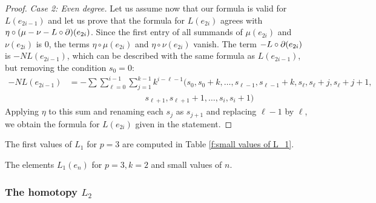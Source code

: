\begin{proof}
    \medskip\noindent\emph{Case 2: Even degree.}
    Let us assume now that our formula is valid for $L(e_{2i-1})$ and let us prove that the formula for $L(e_{2i})$ agrees with $\eta\circ (\mu - \nu - L\circ \operatorname{\partial})(e_{2i})$. Since the first entry of all summands of $\mu(e_{2i})$ and $\nu(e_{2i})$ is $0$, the terms $\eta\circ \mu(e_{2i})$ and $\eta\circ \nu(e_{2i})$ vanish. The term $-L\circ \operatorname{\partial}(e_{2i})$ is $-N L(e_{2i-1})$, which can be described with the same formula as $L(e_{2i-1})$, but removing the condition $s_0 = 0$:
    \begin{align*}
        -N L(e_{2i-1}) &= -\sum\sum_{\ell = 0}^{i-1}\sum_{j=1}^{k-1} k^{i-\ell-1} (s_0,s_0+k,\ldots,s_{\ell-1},s_{\ell-1}+k,s_{\ell},s_{\ell}+j,s_{\ell}+j+1, \\ & \qquad\qquad\qquad \qquad \quad s_{\ell+1},s_{\ell+1}+1,\ldots,s_i,s_i+1)
    \end{align*}
    Applying $\eta$ to this sum and renaming each $s_j$ as $s_{j+1}$ and replacing $\ell-1$ by $\ell$, we obtain the formula for $L(e_{2i})$ given in the statement.
 \end{proof}

The first values of $L_1$ for $p=3$ are computed in Table \ref{f:small values of L_1}.

\begin{table}
	\centering
	
	\caption{The elements $L_1(e_n)$ for $p=3, k=2$ and small values of $n$.}
	\label{f:small values of L_1}
\end{table}

\subsubsection{The homotopy $L_2$}

